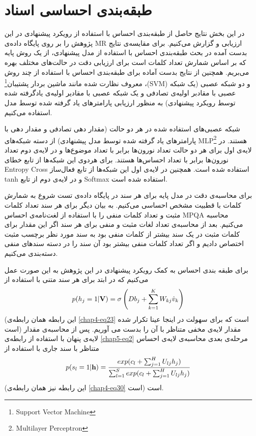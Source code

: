 \section{طبقه‌بندی احساسی اسناد}
\label{chap5sec9}
در این بخش نتایج حاصل از طبقه‌بندی احساس با استفاده از رویکرد پیشنهادی در این پژوهش را بر روی پایگاه داده‌ی
MR
ارزیابی و گزارش می‌‌کنیم. برای مقایسه‌ی نتایج بدست آمده در بحث طبقه‌بندی احساس با استفاده از مدل پیشنهادی، از یک روش پایه که بر اساس شمارش تعداد کلمات است برای ارزیابی دقت در حالت‌های مختلف بهره می‌‌بریم. همچنین از نتایج بدست آماده برای طبقه‌بندی احساس با استفاده از چند روش معروف نظارت شده مانند ماشین بردار پشتیبان\footnote{Support Vector Machine}
،(SVM)
و دو شبکه عصبی (یک شبکه‌ عصبی با مقادبر اولیه‌ی تصادفی و یک شبکه‌ عصبی با مقادیر اولیه‌ی یادگرفته شده توسط رویکرد پیشنهادی) به منظور ارزیابی پارامترهای یاد گرفته شده توسط مدل استفاده می‌کنیم.

شبکه عصبی‌های استفاده شده در هر دو حالت (مقدار دهی تصادفی و مقدار دهی با پارامترهای یاد گرفته شده توسط مدل پیشنهادی) از دسته شبکه‌های 
MLP\footnote{Multilayer Perceptron}
هستند. در لایه‌ی اول برای هر دو حالت تعداد نورون‌ها برابر با تعداد موضوع‌ها و در لایه‌ی دوم تعداد نورون‌ها برابر با تعداد احساس‌ها هستند. برای هردوی این شبکه‌ها از تابع خطای
Entropy Cross 
استفاده شده است. همچنین در لایه‌ی اول این شبکه‌ها از تابع فعال‌ساز 
tanh
و در لایه‌ی دوم از تابع
Softmax
استفاده شده است.
%

برای محاسبه‌ی دقت در مدل پایه برای هر سند در پایگاه داده‌ی تست شروع به شمارش کلمات با قطبیت مشخص احساسی‌ می‌‌کنیم. به بیان دیگر برای هر سند تعداد کلمات مثبت و تعداد کلمات منفی را با استفاده از لغت‌نامه‌ی احساس
MPQA
محاسبه می‌کنیم. بعد از محاسبه‌ی تعداد لغات مثبت و منفی‌ برای هر سند اگر این مقدار برای کلمات مثبت در یک سند بیشتر از کلمات منفی‌ بود به سند مورد نظر برچسب مثبت اختصاص دادیم و اگر تعداد کلمات منفی‌ بیشتر بود آن سند را در دسته سندهای منفی‌ دسته‌بندی می‌کنیم.

برای طبقه بندی احساس به کمک رویکرد پیشنهادی در این پژوهش به این صورت عمل می‌کنیم که در ابتد برای هر سند متنی با استفاده از
\begin{align}
	\centering
	\label{chap5-eq2}
	p(h_{j}=1|\textbf{V})=\sigma \left( Db_j + \sum_{k=1}^{K}W_{kj}\hat{v}_k \right)
\end{align}
(این رابطه‌ همان رابطه‌ی \ref{chap4-eq23} است که برای سهولت در اینجا عینا تکرار شده است) مقدار لایه‌ی مخفی متناظر با آن را بدست می آوریم. پس از محاسبه‌ی مقدار لایه‌ی پنهان با استفاده از رابطه‌ی
\ref{chap5-eq2}
مرحله‌ی بعدی محاسبه‌ی لایه‌ی احساس متناظر با سند جاری با استفاده از
\begin{align}
	\centering
	\label{chap5-eq3}
	p(s_{l}=1|\textbf{h})=\dfrac{exp(c_{l}+\sum_{j=1}^{H}U_{lj}h_j)}{\sum_{l=1}^{S}exp(c_{l}+\sum_{j=1}^{H}U_{lj}h_j)}
\end{align}
(این رابطه‌ نیز همان رابطه‌‌ی \ref{chap4-eq30} است)
است. 

